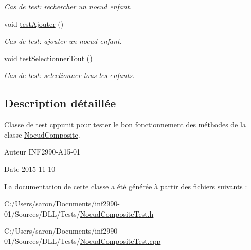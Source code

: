 \begin{DoxyCompactItemize}
\begin{DoxyCompactList}\small\item\em Cas de test\-: rechercher un noeud enfant. \end{DoxyCompactList}\item 
void \hyperlink{group__inf2990_gaaeb7bf3f97cb196df2398cdf1a639469}{test\-Ajouter} ()
\begin{DoxyCompactList}\small\item\em Cas de test\-: ajouter un noeud enfant. \end{DoxyCompactList}\item 
\hypertarget{group__inf2990_ga585be1924a9bfe61c2ee7bf91491695a}{void \hyperlink{group__inf2990_ga585be1924a9bfe61c2ee7bf91491695a}{test\-Selectionner\-Tout} ()}\label{group__inf2990_ga585be1924a9bfe61c2ee7bf91491695a}

\begin{DoxyCompactList}\small\item\em Cas de test\-: selectionner tous les enfants. \end{DoxyCompactList}\end{DoxyCompactItemize}


\subsection{Description détaillée}
Classe de test cppunit pour tester le bon fonctionnement des méthodes de la classe \hyperlink{class_noeud_composite}{Noeud\-Composite}. 

\begin{DoxyAuthor}{Auteur}
I\-N\-F2990-\/\-A15-\/01 
\end{DoxyAuthor}
\begin{DoxyDate}{Date}
2015-\/11-\/10 
\end{DoxyDate}


La documentation de cette classe a été générée à partir des fichiers suivants \-:\begin{DoxyCompactItemize}
\item 
C\-:/\-Users/saron/\-Documents/inf2990-\/01/\-Sources/\-D\-L\-L/\-Tests/\hyperlink{_noeud_composite_test_8h}{Noeud\-Composite\-Test.\-h}\item 
C\-:/\-Users/saron/\-Documents/inf2990-\/01/\-Sources/\-D\-L\-L/\-Tests/\hyperlink{_noeud_composite_test_8cpp}{Noeud\-Composite\-Test.\-cpp}\end{DoxyCompactItemize}
